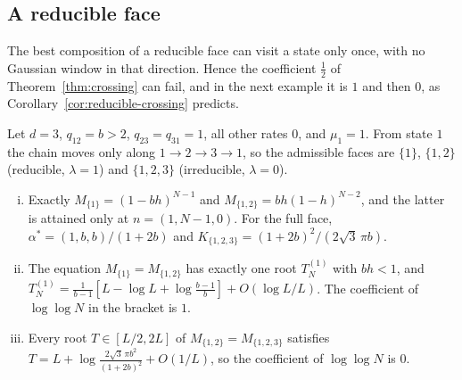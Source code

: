 \subsection{A reducible face}\label{sec:reducible}

The best composition of a reducible face can visit a state only once, with no
Gaussian window in that direction. Hence the coefficient $\frac12$ of
Theorem~\ref{thm:crossing} can fail, and in the next example it is $1$ and then $0$, as
Corollary~\ref{cor:reducible-crossing} predicts.

\begin{example}\label{ex:threecycle}
Let $d=3$, $q_{12}=b>2$, $q_{23}=q_{31}=1$, all other rates $0$, and
$\mu_1=1$. From state $1$ the chain moves only along $1\to2\to3\to1$, so the
admissible faces are $\{1\}$, $\{1,2\}$ (reducible, $\lambda=1$) and
$\{1,2,3\}$ (irreducible, $\lambda=0$).
\begin{enumerate}[(i)]
\item Exactly $M_{\{1\}}=(1-bh)^{N-1}$ and $M_{\{1,2\}}=bh(1-h)^{N-2}$, and the latter is
attained only at $n=(1,N-1,0)$. For the full face,
$\alpha^*=(1,b,b)/(1+2b)$ and $K_{\{1,2,3\}}=(1+2b)^2/(2\sqrt3\,\pi b)$.
\item The equation $M_{\{1\}}=M_{\{1,2\}}$ has exactly one root $T^{(1)}_N$ with $bh<1$, and
$T^{(1)}_N=\frac1{b-1}[L-\log L+\log\frac{b-1}b]+O(\log L/L)$. The coefficient of
$\log\log N$ in the bracket is $1$.
\item Every root $T\in[L/2,2L]$ of $M_{\{1,2\}}=M_{\{1,2,3\}}$ satisfies
$T=L+\log\frac{2\sqrt3\,\pi b^2}{(1+2b)^2}+O(1/L)$, so the coefficient of
$\log\log N$ is $0$.
\end{enumerate}
\end{example}

